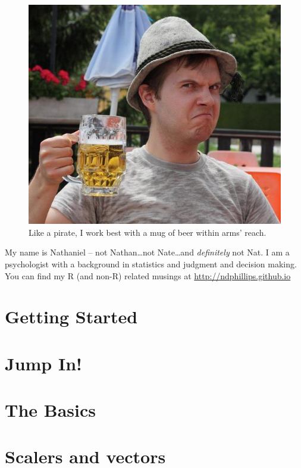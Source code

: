 \documentclass[]{book}
\begin{document}
\begin{figure}

{\centering \includegraphics[width=7.49in]{images/beer} 

}

\caption{Like a pirate, I work best with a mug of beer within arms' reach.}\label{fig:unnamed-chunk-6}
\end{figure}

My name is Nathaniel -- not Nathan\ldots{}not Nate\ldots{}and
\emph{definitely} not Nat. I am a psychologist with a background in
statistics and judgment and decision making. You can find my R (and
non-R) related musings at \url{http://ndphillips.github.io}

\chapter{Getting Started}\label{started}

\chapter{Jump In!}\label{jumpin}

\chapter{The Basics}\label{basics}

\chapter{Scalers and vectors}\label{scalersvectors}
\end{document}

